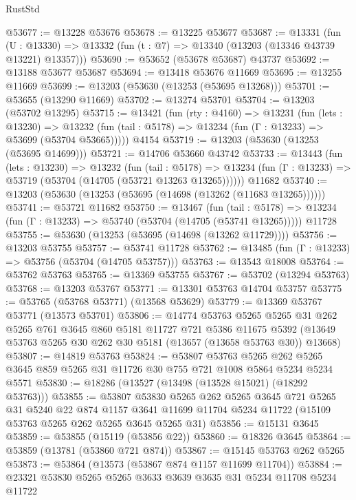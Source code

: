 \begin{lexlean}{RustStd}
\begin{coremodule}
@53677 := @13228 @53676
@53678 := @13225 @53677
@53687 := @13331
    (fun (U : @13330) => @13332 (fun (t : @7) => @13340 (@13203 (@13346 @43739 @13221) @13357)))
@53690 := @53652 (@53678 @53687) @43737
@53692 := @13188 @53677 @53687
@53694 := @13418 @53676 @11669
@53695 := @13255 @11669
@53699 := @13203 (@53630 (@13253 (@53695 @13268)))
@53701 := @53655 (@13290 @11669)
@53702 := @13274 @53701
@53704 := @13203 (@53702 @13295)
@53715 := @13421
    (fun (rty : @4160) =>
    @13231
      (fun (lets : @13230) =>
      @13232 (fun (tail : @5178) => @13234 (fun (Γ : @13233) => @53699 (@53704 @53665)))))
    @4154
@53719 := @13203 (@53630 (@13253 (@53695 @14699)))
@53721 := @14706 @53660 @43742
@53733 := @13443
    (fun (lets : @13230) =>
    @13232
      (fun (tail : @5178) =>
      @13234 (fun (Γ : @13233) => @53719 (@53704 (@14705 (@53721 @13263 @13265))))))
    @11682
@53740 := @13203 (@53630 (@13253 (@53695 (@14698 (@13262 (@11683 @13265))))))
@53741 := @53721 @11682
@53750 := @13467
    (fun (tail : @5178) => @13234 (fun (Γ : @13233) => @53740 (@53704 (@14705 (@53741 @13265)))))
    @11728
@53755 := @53630 (@13253 (@53695 (@14698 (@13262 @11729))))
@53756 := @13203 @53755
@53757 := @53741 @11728
@53762 := @13485 (fun (Γ : @13233) => @53756 (@53704 (@14705 @53757)))
@53763 := @13543 @18008
@53764 := @53762 @53763
@53765 := @13369 @53755
@53767 := @53702 (@13294 @53763)
@53768 := @13203 @53767
@53771 := @13301 @53763 @14704 @53757
@53775 := @53765 (@53768 @53771) (@13568 @53629)
@53779 := @13369 @53767 @53771 (@13573 @53701)
@53806 := @14774
    @53763
    @5265
    @5265
    @31
    @262
    @5265
    @761
    @3645
    @860
    @5181
    @11727
    @721
    @5386
    @11675
    @5392
    (@13649 @53763 @5265 @30 @262 @30 @5181 (@13657 (@13658 @53763 @30)) @13668)
@53807 := @14819 @53763
@53824 := @53807
    @53763
    @5265
    @262
    @5265
    @3645
    @859
    @5265
    @31
    @11726
    @30
    @755
    @721
    @1008
    @5864
    @5234
    @5234
    @5571
@53830 := @18286 (@13527 (@13498 (@13528 @15021) (@18292 @53763)))
@53855 := @53807
    @53830
    @5265
    @262
    @5265
    @3645
    @721
    @5265
    @31
    @5240
    @22
    @874
    @1157
    @3641
    @11699
    @11704
    @5234
    @11722
    (@15109 @53763 @5265 @262 @5265 @3645 @5265 @31)
@53856 := @15131 @3645
@53859 := @53855 (@15119 (@53856 @22))
@53860 := @18326 @3645
@53864 := @53859 (@13781 (@53860 @721 @874))
@53867 := @15145 @53763 @262 @5265
@53873 := @53864 (@13573 (@53867 @874 @1157 @11699 @11704))
@53884 := @23321 @53830 @5265 @5265 @3633 @3639 @3635 @31 @5234 @11708 @5234 @11722

\end{coremodule}
\end{lexlean}
